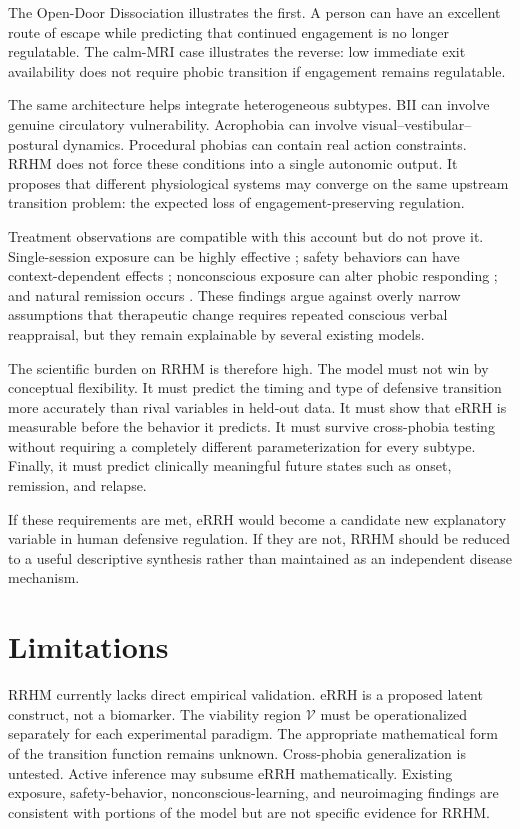 \documentclass[9pt,twocolumn]{article}
\begin{document}
The Open-Door Dissociation illustrates the first. A person can have an excellent route of escape while predicting that continued engagement is no longer regulatable. The calm-MRI case illustrates the reverse: low immediate exit availability does not require phobic transition if engagement remains regulatable.

The same architecture helps integrate heterogeneous subtypes. BII can involve genuine circulatory vulnerability. Acrophobia can involve visual--vestibular--postural dynamics. Procedural phobias can contain real action constraints. RRHM does not force these conditions into a single autonomic output. It proposes that different physiological systems may converge on the same upstream transition problem: the expected loss of engagement-preserving regulation.

Treatment observations are compatible with this account but do not prove it. Single-session exposure can be highly effective \cite{odgers2022}; safety behaviors can have context-dependent effects \cite{meckes2025}; nonconscious exposure can alter phobic responding \cite{siegel2025}; and natural remission occurs \cite{trumpf2009remission}. These findings argue against overly narrow assumptions that therapeutic change requires repeated conscious verbal reappraisal, but they remain explainable by several existing models.

The scientific burden on RRHM is therefore high. The model must not win by conceptual flexibility. It must predict the timing and type of defensive transition more accurately than rival variables in held-out data. It must show that eRRH is measurable before the behavior it predicts. It must survive cross-phobia testing without requiring a completely different parameterization for every subtype. Finally, it must predict clinically meaningful future states such as onset, remission, and relapse.

If these requirements are met, eRRH would become a candidate new explanatory variable in human defensive regulation. If they are not, RRHM should be reduced to a useful descriptive synthesis rather than maintained as an independent disease mechanism.

\section{Limitations}
RRHM currently lacks direct empirical validation. eRRH is a proposed latent construct, not a biomarker. The viability region $\mathcal V$ must be operationalized separately for each experimental paradigm. The appropriate mathematical form of the transition function remains unknown. Cross-phobia generalization is untested. Active inference may subsume eRRH mathematically. Existing exposure, safety-behavior, nonconscious-learning, and neuroimaging findings are consistent with portions of the model but are not specific evidence for RRHM.
\end{document}
